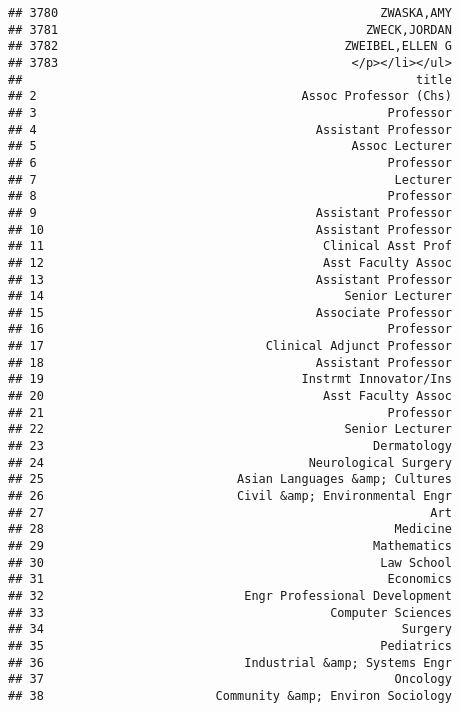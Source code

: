 \documentclass[
]{article}
\begin{document}
\begin{verbatim}
## 3780                                             ZWASKA,AMY
## 3781                                           ZWECK,JORDAN
## 3782                                        ZWEIBEL,ELLEN G
## 3783                                         </p></li></ul>
##                                                       title
## 2                                     Assoc Professor (Chs)
## 3                                                 Professor
## 4                                       Assistant Professor
## 5                                            Assoc Lecturer
## 6                                                 Professor
## 7                                                  Lecturer
## 8                                                 Professor
## 9                                       Assistant Professor
## 10                                      Assistant Professor
## 11                                       Clinical Asst Prof
## 12                                       Asst Faculty Assoc
## 13                                      Assistant Professor
## 14                                          Senior Lecturer
## 15                                      Associate Professor
## 16                                                Professor
## 17                               Clinical Adjunct Professor
## 18                                      Assistant Professor
## 19                                    Instrmt Innovator/Ins
## 20                                       Asst Faculty Assoc
## 21                                                Professor
## 22                                          Senior Lecturer
## 23                                              Dermatology
## 24                                     Neurological Surgery
## 25                           Asian Languages &amp; Cultures
## 26                           Civil &amp; Environmental Engr
## 27                                                      Art
## 28                                                 Medicine
## 29                                              Mathematics
## 30                                               Law School
## 31                                                Economics
## 32                            Engr Professional Development
## 33                                        Computer Sciences
## 34                                                  Surgery
## 35                                               Pediatrics
## 36                            Industrial &amp; Systems Engr
## 37                                                 Oncology
## 38                        Community &amp; Environ Sociology

\end{verbatim}
\end{document}
